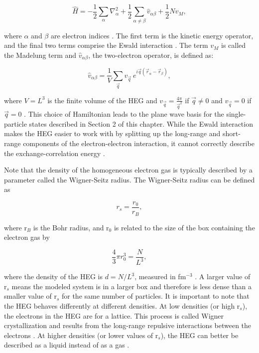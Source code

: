 \begin{equation}
    \hat{H} = -\frac{1}{2}\sum_\alpha \nabla^2_\alpha + \frac{1}{2}\sum_{\alpha \neq \beta}\hat{v}_{\alpha\beta} + \frac{1}{2}Nv_M,
\end{equation}

where $\alpha$ and $\beta$ are electron indices \cite{Ref1}.  The first term is the kinetic energy operator, and the final two terms comprise the Ewald interaction \cite{Ref1}. The term $v_M$ is called the Madelung term and $\hat{v}_{\alpha\beta}$, the two-electron operator, is defined as:

\begin{equation}\label{two_electron_operator}
    \hat{v}_{\alpha\beta} = \frac{1}{V}\sum_{\vec{q}} v_{\vec{q}}\ e^{i\vec{q}(\vec{r}_\alpha - \vec{r}_\beta)},
\end{equation}

where $V = L^3$ is the finite volume of the HEG and $v_{\vec{q}} = \frac{4\pi}{{\vec{q}}^2}$ if $\vec{q} \neq 0$ and $v_{\vec{q}} = 0$ if $\vec{q} = 0$ \cite{Ref1}. This choice of Hamiltonian leads to the plane wave basis for the single-particle states described in Section 2 of this chapter. While the Ewald interaction makes the HEG easier to work with by splitting up the long-range and short-range components of the electron-electron interaction, it cannot correctly describe the exchange-correlation energy \cite{Ref4}.

Note that the density of the homogeneous electron gas is typically described by a parameter called the Wigner-Seitz radius. The Wigner-Seitz radius can be defined as

\begin{equation}
    r_s = \frac{r_0}{r_B},
\end{equation}

where r$_B$ is the Bohr radius, and r$_0$ is related to the size of the box containing the electron gas by

\begin{equation}
    \frac{4}{3}\pi r_0^3 = \frac{N}{L^3},
\end{equation}

where the density of the HEG is $d = N/L^3$, measured in fm$^{-3}$ \cite{Ref5}. A larger value of r$_s$ means the modeled system is in a larger box and therefore is less dense than a smaller value of r$_s$ for the same number of particles. It is important to note that the HEG behaves differently at different densities. At low densities (or high r$_s$), the electrons in the HEG are for a lattice. This process is called Wigner crystallization and results from the long-range repulsive interactions between the electrons \cite{Ref4}. At higher densities (or lower values of r$_s$), the HEG can better be described as a liquid instead of as a gas \cite{Ref4}.


